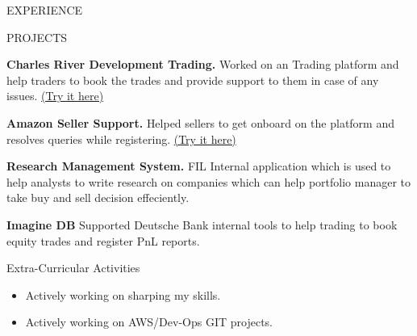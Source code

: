 \documentclass{resume} %
\begin{document}
\begin{sloppypar}
\begin{rSection}{EXPERIENCE}
    \end{rSection}


    \begin{rSection}{PROJECTS}
        \vspace{-1.25em}
        \item \textbf{Charles River Development Trading.} {Worked on an Trading platform and help traders to book the trades and provide support to them in case of any issues. \href{https://www.crd.com/company/about-us/}{(Try it here)}}
        \item \textbf{Amazon Seller Support.} {Helped sellers to get onboard on the platform and resolves queries while registering. \href{https://sell.amazon.com/}{(Try it here)}}
        \item \textbf{Research Management System.} {FIL Internal application which is used to help analysts to write research on companies which can help portfolio manager to take buy and sell decision effeciently.}
        \item \textbf{Imagine DB} {Supported Deutsche Bank internal tools to help trading to book equity trades and register PnL reports.}
    \end{rSection}

    \begin{rSection}{Extra-Curricular Activities}
        \begin{itemize}
            \item 	Actively working on sharping my skills.
            \item  	Actively working on AWS/Dev-Ops GIT projects.
        \end{itemize}


    \end{rSection}


\end{sloppypar}
\end{document}
